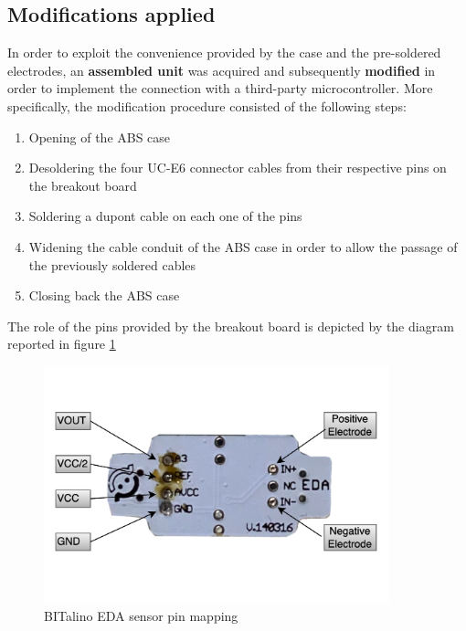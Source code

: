 
\subsection{Modifications applied}\label{subsec:bitalno-modifications}

In order to exploit the convenience provided by the case and the pre-soldered electrodes, an \textbf{assembled unit} was acquired and subsequently \textbf{modified} in order to implement the connection with a third-party microcontroller. More specifically, the modification procedure consisted of the following steps: 

\begin{enumerate}
    \item Opening of the ABS case
    \item Desoldering the four UC-E6 connector cables from their respective pins on the breakout board
    \item Soldering a dupont cable on each one of the pins
    \item Widening the cable conduit of the ABS case in order to allow the passage of the previously soldered cables
    \item Closing back the ABS case
\end{enumerate}

The role of the pins provided by the breakout board is depicted by the diagram reported in figure \ref{fig:bitalino-pinmap}

\begin{figure}[h]
    \centering
    \includegraphics[width=10cm]{./images/bitalino.drawio.png}
    \caption{BITalino EDA sensor pin mapping}
    \label{fig:bitalino-pinmap}
\end{figure}

\vspace{1cm}

